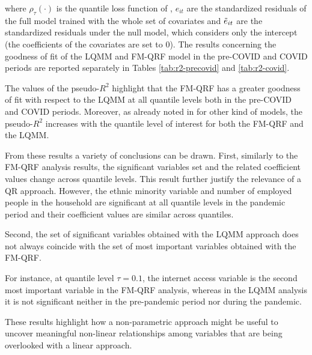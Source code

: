\noindent where $\rho_{\tau}(\cdot)$ is the quantile loss function of \cite{koenker1978regression}, $e_{it}$ are the standardized residuals of the full model trained with the whole set of covariates and
$\Tilde{e}_{it}$ are the standardized residuals under the null model, which considers only the intercept (the coefficients of the covariates are set to 0). The results concerning the goodness of fit of the LQMM and FM-QRF model in the pre-COVID and COVID periods are reported separately in Tables \ref{tab:r2-precovid} and \ref{tab:r2-covid}.





\noindent The values of the pseudo-$R^2$ highlight that the FM-QRF has a greater goodness of fit with respect to the LQMM at all quantile levels both in the pre-COVID and COVID periods. Moreover, as already noted in \cite{} for other kind of models, the pseudo-$R^2$ increases with the quantile level of interest for both the FM-QRF and the LQMM.


\vspace{0.15in}

\noindent From these results a variety of conclusions can be drawn. 
First, similarly to the FM-QRF analysis results, the significant variables set and the related coefficient values change across quantile levels. This result further justify the relevance of a QR approach. However, the ethnic minority variable and number of employed people in the household are significant at all quantile levels in the pandemic period and their coefficient values are similar across quantiles.

\vspace{0.15in}

\noindent Second, the set of significant variables obtained with the LQMM approach does not always coincide with the set of most important variables obtained with the FM-QRF.

\vspace{0.15in}

\noindent For instance, at quantile level $\tau=0.1$, the internet access variable is the second most important variable in the FM-QRF analysis, whereas in the LQMM analysis it is not significant neither in the pre-pandemic period nor during the pandemic. 

\vspace{0.15in}

\noindent These results highlight how a non-parametric approach might be useful to uncover meaningful non-linear relationships among variables that are being overlooked with a linear approach.

